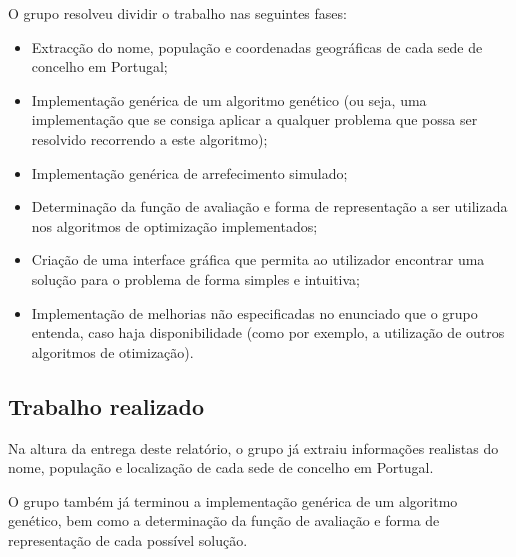 \documentclass[11pt,a4paper,reqno]{article}
\numberwithin{equation}{section}
\begin{document}
O grupo resolveu dividir o trabalho nas seguintes fases:
\begin{itemize}
\item Extracção do nome, população e coordenadas geográficas de cada sede de concelho em Portugal;
\item Implementação genérica de um algoritmo genético (ou seja, uma implementação que se consiga aplicar a qualquer problema que possa ser resolvido recorrendo a este algoritmo);
\item Implementação genérica de arrefecimento simulado;
\item Determinação da função de avaliação e forma de representação a ser utilizada nos algoritmos de optimização implementados;
\item Criação de uma interface gráfica que permita ao utilizador encontrar uma solução para o problema de forma simples e intuitiva;
\item Implementação de melhorias não especificadas no enunciado que o grupo entenda, caso haja disponibilidade (como por exemplo, a utilização de outros algoritmos de otimização).
\end{itemize}


\subsection{Trabalho realizado}
Na altura da entrega deste relatório, o grupo já extraiu informações realistas do nome, população e localização de cada sede de concelho em Portugal.

O grupo também já terminou a implementação genérica de um algoritmo genético, bem como a determinação da função de avaliação e forma de representação de cada possível solução.




\end{document}
